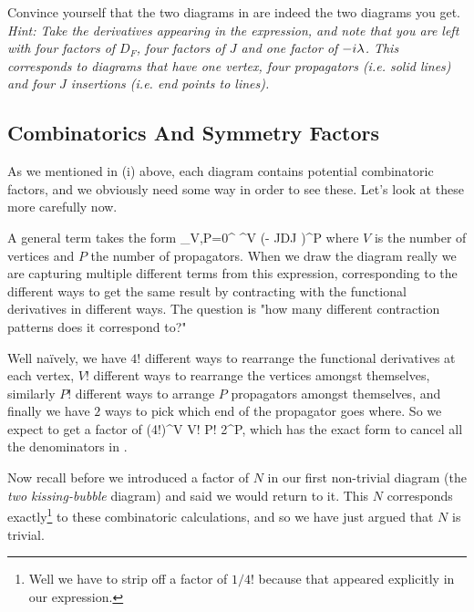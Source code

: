 \bbox 
    Convince yourself that the two diagrams in  are indeed the two diagrams you get. \textit{Hint: Take the derivatives appearing in the expression, and note that you are left with four factors of $D_F$, four factors of $J$ and one factor of $-i\lambda$. This corresponds to diagrams that have one vertex, four propagators (i.e. solid lines) and four $J$ insertions (i.e. end points to lines).}
\ebox 

\subsection{Combinatorics And Symmetry Factors}

As we mentioned in (i) above, each diagram contains potential combinatoric factors, and we obviously need some way in order to see these. Let's look at these more carefully now.

A general term takes the form 
\be 
\label{eqn:GeneralDiagram}
    \sum_{V,P=0}^{\infty}  ^V  \bigg(- J\cdot D\cdot J \bigg)^P
\ee 
where $V$ is the number of vertices and $P$ the number of propagators. When we draw the diagram really we are capturing multiple different terms from this expression, corresponding to the different ways to get the same result by contracting with the functional derivatives in different ways. The question is "how many different contraction patterns does it correspond to?" 

Well na\"{i}vely, we have $4!$ different ways to rearrange the functional derivatives at each vertex, $V!$ different ways to rearrange the vertices amongst themselves, similarly $P!$ different ways to arrange $P$ propagators amongst themselves, and finally we have $2$ ways to pick which end of the propagator goes where. So we expect to get a factor of
\bse 
    (4!)^V V! P! 2^P,
\ese 
which has the exact form to cancel all the denominators in . 

Now recall before we introduced a factor of $N$ in our first non-trivial diagram (the \textit{two kissing-bubble} diagram) and said we would return to it. This $N$ corresponds exactly\footnote{Well we have to strip off a factor of $1/4!$ because that appeared explicitly in our expression.} to these combinatoric calculations, and so we have just argued  that $N$ is trivial. 

